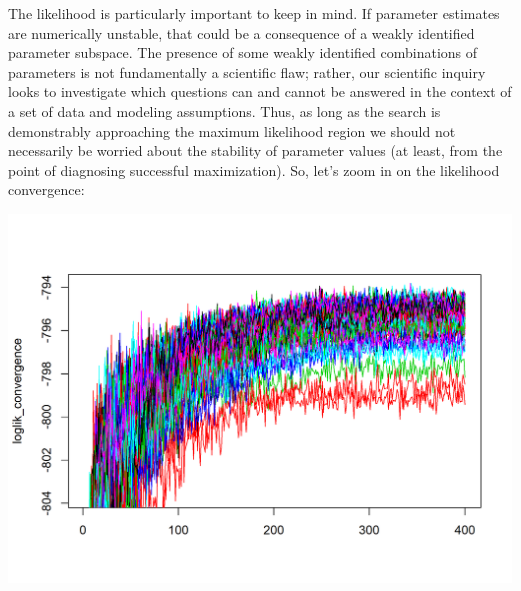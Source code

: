 \documentclass[]{article}
\newenvironment{Shaded}{\begin{snugshade}}{\end{snugshade}}
\newcommand{\KeywordTok}[1]{\textcolor[rgb]{0.13,0.29,0.53}{\textbf{#1}}}
\newcommand{\DataTypeTok}[1]{\textcolor[rgb]{0.13,0.29,0.53}{#1}}
\newcommand{\DecValTok}[1]{\textcolor[rgb]{0.00,0.00,0.81}{#1}}
\newcommand{\StringTok}[1]{\textcolor[rgb]{0.31,0.60,0.02}{#1}}
\newcommand{\OperatorTok}[1]{\textcolor[rgb]{0.81,0.36,0.00}{\textbf{#1}}}
\newcommand{\NormalTok}[1]{#1}
\begin{document}
The likelihood is particularly important to keep in mind. If parameter
estimates are numerically unstable, that could be a consequence of a
weakly identified parameter subspace. The presence of some weakly
identified combinations of parameters is not fundamentally a scientific
flaw; rather, our scientific inquiry looks to investigate which
questions can and cannot be answered in the context of a set of data and
modeling assumptions. Thus, as long as the search is demonstrably
approaching the maximum likelihood region we should not necessarily be
worried about the stability of parameter values (at least, from the
point of diagnosing successful maximization). So, let's zoom in on the
likelihood convergence:

\begin{Shaded}
\end{Shaded}

\begin{center}\includegraphics{figure/sp500-likelihood_convergence-1} \end{center}
\end{document}
